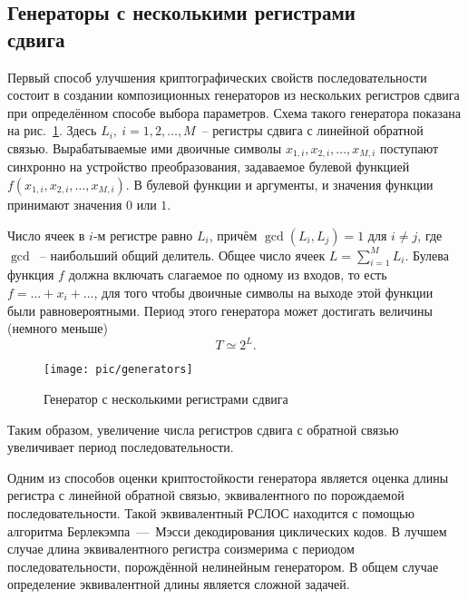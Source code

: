 \subsection[Генераторы с несколькими регистрами сдвига]{Генераторы с несколькими регистрами \protect\\ сдвига}

Первый способ улучшения криптографических свойств последовательности состоит в создании композиционных генераторов из нескольких регистров сдвига при определённом способе выбора параметров. Схема такого генератора показана на рис.~\ref{fig:generators}. Здесь $L_i, ~ i = 1, 2, \dots, M$~-- регистры сдвига с линейной обратной связью. Вырабатываемые ими двоичные символы $x_{1,i}, x_{2,i}, \dots, x_{M,i}$ поступают синхронно на устройство преобразования, задаваемое булевой функцией $f(x_{1,i}, x_{2,i}, \dots, x_{M,i})$. В булевой функции и аргументы, и значения функции принимают значения $0$ или $1$.

Число ячеек в $i$-м регистре равно $L_{i}$, причём $\gcd(L_i, L_j)=1$ для $i \neq j$, где $\gcd$~-- наибольший общий делитель. Общее число ячеек $L = \sum\limits_{i=1}^M L_i$. Булева функция $f$ должна включать слагаемое по одному из входов, то есть $f = \dots + x_i + \dots$, для того чтобы двоичные символы на выходе этой функции были равновероятными. Период этого генератора может достигать величины (немного меньше)
    \[ T \simeq 2^L. \]

\begin{figure}[!ht]
	\centering
	\texttt{[image: pic/generators]}
    \caption{Генератор с несколькими регистрами сдвига\label{fig:generators}}
\end{figure}

Таким образом, увеличение числа регистров сдвига с обратной связью увеличивает период последовательности.

Одним из способов оценки криптостойкости генератора является оценка длины регистра с линейной обратной связью, эквивалентного по порождаемой последовательности. Такой эквивалентный РСЛОС находится с помощью алгоритма Берлекэмпа~---~Мэсси декодирования циклических кодов. В лучшем случае длина эквивалентного регистра соизмерима с периодом последовательности, порождённой нелинейным генератором. В общем случае определение эквивалентной длины является сложной задачей.
